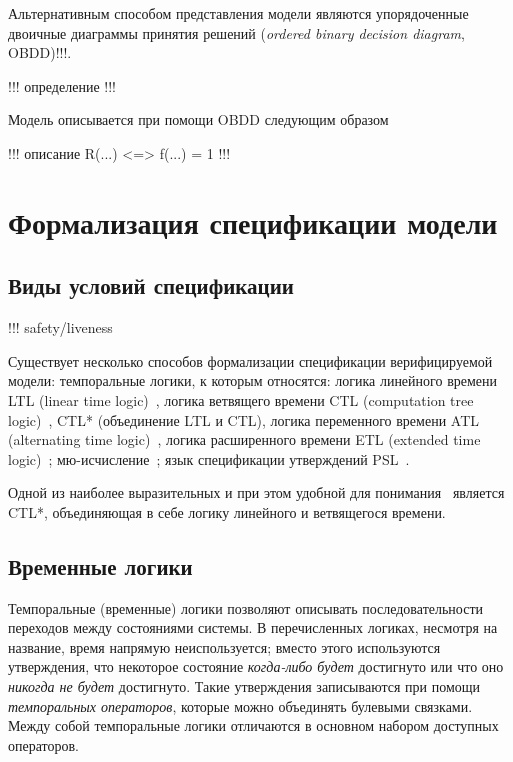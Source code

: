 \documentclass[a4paper,notitlepage,14pt]{article}
\begin{document}
Альтернативным способом представления модели являются упорядоченные двоичные диаграммы
принятия решений (\emph{ordered binary decision diagram}, OBDD)!!!. 

!!! определение !!!

Модель описывается при помощи OBDD следующим образом 

!!! описание R(...) <=> f(...) = 1 !!!

\section{Формализация спецификации модели}
\label{sec:specification}

\subsection{Виды условий спецификации}
\label{sec:cond-types}

!!! safety/liveness

Существует несколько способов формализации спецификации верифицируемой модели:
темпоральные логики, к которым относятся: логика линейного времени LTL (linear time
logic)~\cite{Clarke,Stirling96modaland}, логика ветвящего времени CTL (computation tree
logic)~\cite{Clarke,Pandya01modelchecking}, CTL* (объединение LTL и CTL), логика
переменного времени ATL (alternating time logic)~\cite{Stirling96modaland}, логика
расширенного времени ETL (extended time logic)~\cite{Emerson90temporaland};
мю-исчисление~\cite{Leucker_parallelmodel,Emerson97modelchecking}; язык спецификации
утверждений PSL~\cite{Glazberg_psl:beyond}.

Одной из наиболее выразительных и при этом удобной для понимания~\cite{Stirling96modaland}
является CTL*, объединяющая в себе логику линейного и ветвящегося времени.

\subsection{Временные логики}
\label{sec:temporal-logics}

Темпоральные (временные) логики позволяют описывать последовательности переходов между
состояниями системы. В перечисленных логиках, несмотря на название, время напрямую
неиспользуется; вместо этого используются утверждения, что некоторое состояние
\emph{когда-либо будет} достигнуто или что оно \emph{никогда не будет} достигнуто. Такие
утверждения записываются при помощи \emph{темпоральных операторов}, которые можно
объединять булевыми связками. Между собой темпоральные логики отличаются в основном
набором доступных операторов.
\end{document}
